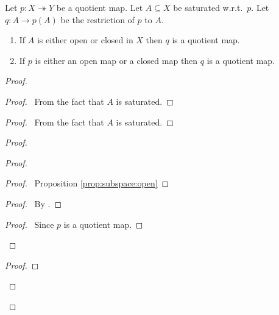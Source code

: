 \begin{prop}
  Let $p : X \twoheadrightarrow Y$ be a quotient map. Let $A \subseteq X$ be saturated w.r.t.~$p$. Let $q : A \rightarrow p(A)$ be the restriction of $p$ to $A$.
  \begin{enumerate}
    \item
    If $A$ is either open or closed in $X$ then $q$ is a quotient map.
    \item
    If $p$ is either an open map or a closed map then $q$ is a quotient map.
  \end{enumerate}
\end{prop}

\begin{proof}
  \pf
  \begin{proof}
    \pf\ From the fact that $A$ is saturated.
  \end{proof}
  \begin{proof}
    \pf\ From the fact that $A$ is saturated.
  \end{proof}
  \begin{proof}
    \begin{proof}
      \begin{proof}
        \pf\ Proposition \ref{prop:subspace:open}
      \end{proof}
      \begin{proof}
        \pf\ By .
      \end{proof}
      \begin{proof}
        \pf\ Since $p$ is a quotient map.
      \end{proof}
    \end{proof}
    \begin{proof}

\end{proof}
\end{proof}
\end{proof}
